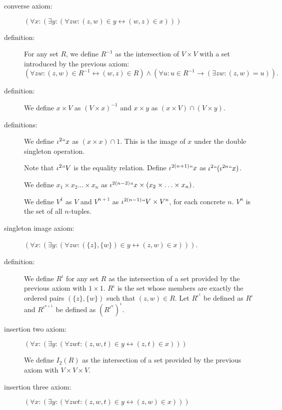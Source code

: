 \documentclass{article}
\theoremstyle{definition}
\theoremstyle{remark}
\begin{document}
\begin{description}
\item[converse axiom:] $(\forall x:(\exists y:(\forall zw:(z,w)\in y \leftrightarrow (w,z) \in x)))$



\item[definition:]  For any set $R$, we define $R^{-1}$ as the intersection of $V \times V$ with a set introduced by the previous axiom:  $$(\forall zw:(z,w)\in R^{-1} \leftrightarrow (w,z) \in R) \wedge (\forall u:u \in R^{-1} \rightarrow (\exists zw:(z,w)=u)).$$

\item[definition:]  We define $x \times V$ as $(V \times x)^{-1}$ and $x \times y$ as $(x \times V) \cap (V \times y)$.

\item[definitions:] We define $\iota^2``x$ as $(x \times x) \cap 1$.  This is the image of $x$ under the double singleton operation.

Note that $\iota^2``V$ is the equality relation.  Define $\iota^{2(n+1)}``x$ as $\iota^2``(\iota^{2n}``x)$.

We define $x_1 \times x_2 \ldots \times x_n$ as $\iota^{2(n-2)}``x \times (x_2 \times \ldots \times x_n)$.

We define $V^1$ as $V$ and $V^{n+1}$ as $\iota^{2(n-1)}``V\times V^n$, for each concrete $n$.  $V^n$ is the set of all $n$-tuples.

\item[singleton image axiom:]  $(\forall x:(\exists y:(\forall zw:(\{z\},\{w\}) \in y \leftrightarrow (z,w) \in x)))$.
\item[definition:]  We define $R^{\iota}$ for any set $R$ as the intersection of a set provided by the previous axiom with $1 \times 1$.  $R^{\iota}$ is the set whose members are exactly the ordered pairs $(\{z\},\{w\})$ such that $(z,w)\in R$.  Let $R^{\iota^1}$ be defined as $R^{\iota}$ and $R^{\iota^{n+1}}$ be defined as $(R^{\iota^n})^\iota$.



\item[insertion two axiom:]  $(\forall x:(\exists y:(\forall zwt:(z,w,t) \in y \leftrightarrow (z,t) \in x)))$

We define $I_2(R)$ as the intersection of a set provided by the previous axiom with $V \times V \times V$.

\item[insertion three axiom:] $(\forall x:(\exists y:(\forall zwt:(z,w,t) \in y \leftrightarrow (z,w) \in x)))$


\end{description}
\end{document}

